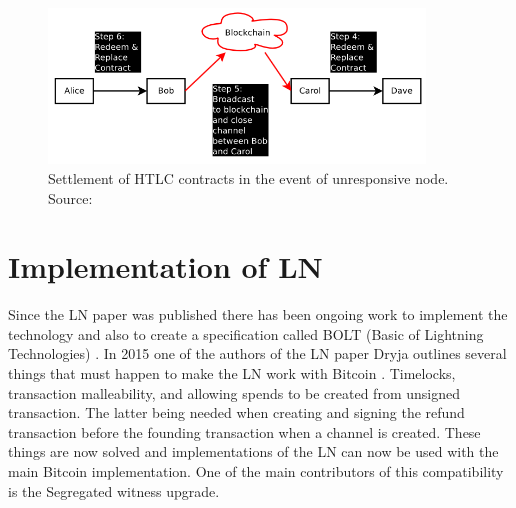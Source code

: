 \documentclass[informationsecurity]{gucmasterproject}
\begin{document}
\begin{figure}[h]
    \centering
    \includegraphics[width=10cm]{figs/htlc_bc.png}
    \caption{ Settlement of HTLC contracts in the event of unresponsive node. Source: \cite{poon2015bitcoin}}
    \label{fig:htlc_bc}
\end{figure}


\chapter{Implementation of LN}

Since the LN paper was published \cite{poon2015bitcoin} there has been ongoing work to implement the technology\cite{LN_imp1}\cite{LN_imp2}\cite{LN_imp3} and also to create a specification called BOLT (Basic of Lightning Technologies) \cite{LN_spec}. In 2015 one of the authors of the LN paper Dryja outlines several things that must happen to make the LN work with Bitcoin \cite{SB_bip}. Timelocks, transaction malleability, and allowing spends to be created from unsigned transaction.
The latter being needed when creating and signing the refund transaction before the founding transaction when a channel is created.
These things are now solved and implementations of the LN can now be used with the main Bitcoin implementation. One of the main contributors of this compatibility is the Segregated witness upgrade.
\end{document}
